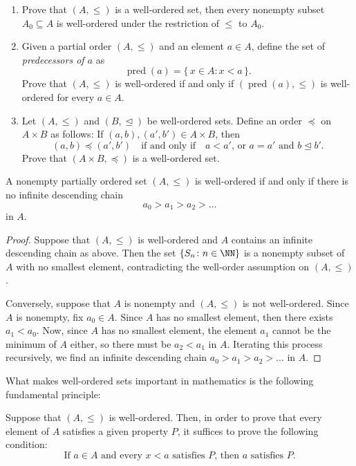 \begin{exercises}\hfill
\label{exe:well-order}
\begin{enumerate}
\item
Prove that $(A, \le)$ is a well-ordered set, then every nonempty subset $A_0 \subseteq A$ is well-ordered under the restriction of $\le$ to $A_0$.
\item
  \label{exe:initial-segment}
  Given a partial order $(A,\leq)$ and an element $a\in A$, define the set of \emph{predecessors of $a$} as
  \[
    \operatorname{pred}(a)= \{\, x\in A \colon x<a\,\}.
  \]
  Prove that $(A,\leq)$ is well-ordered if and only if $(\operatorname{pred}(a),\le)$ is well-ordered for every $a\in A$.
\item
  Let $(A,\leq)$ and $(B,\trianglelefteq)$ be well-ordered sets.
  Define an order $\preceq$ on $A\times B$ as follows:
  If $(a,b), (a',b')\in A\times B$, then
  \[
    (a,b) \preceq (a',b')
    \quad\text{if and only if}\quad
    \text{$a< a'$, or $a=a'$ and $b\trianglelefteq b'$}.
  \]
  Prove that $(A\times B,\preceq)$ is a well-ordered set.
\end{enumerate}
\end{exercises}

\begin{proposition}
  A nonempty partially ordered set $(A,\le)$ is well-ordered if and only if there is no infinite descending chain
  \[
    a_0>a_1>a_2>\dots
  \]
  in $A$.
\end{proposition}

\begin{proof}
  Suppose that   $(A,\le)$ is well-ordered and $A$ contains an infinite descending chain as above.
  Then the set $\{S_n\colon n\in \NN\}$ is a nonempty subset of $A$ with no smallest element, contradicting the well-order assumption on   $(A,\le)$.

  Conversely, suppose that $A$ is nonempty and $(A,\le)$ is not well-ordered.
  Since $A$ is nonempty, fix $a_0\in A$.
  Since $A$ has no smallest element, then there exists $a_1<a_0$.
  Now, since $A$ has no smallest element, the element $a_1$ cannot be the minimum of $A$ either, so there must be $a_2<a_1$ in $A$.
  Iterating this process recursively, we find an infinite descending chain $a_0>a_1>a_2>\dots$ in $A$.
\end{proof}

What makes well-ordered sets important in mathematics is the following fundamental principle:

\begin{theorem}
  \label{thm:induction}
  Suppose that   $(A,\le)$ is well-ordered.
  Then, in order to prove that every element of $A$ satisfies a given property $P$, it suffices to prove the following condition:
  \[
    \tag{IH}
    \text{If $a\in A$ and every $x<a$ satisfies $P$, then $a$ satisfies $P$.}
  \]
\end{theorem}

